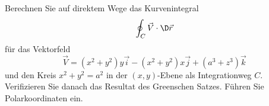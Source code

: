 \begin{atiTask}[
  title = Kurvenintegral mit Polarkoordinaten
]
Berechnen Sie auf direktem Wege das Kurvenintegral
\[
\oint_C \vec{V}\cdot \D \vec{r}
\]
für das Vektorfeld
\[
\vec{V}=(x^2+y^2)y\vec{i}-(x^2+y^2)x\vec{j}+(a^3+z^3)\vec{k}
\]
und den Kreis $x^2+y^2=a^2$ in der $(x,y)$-Ebene als Integrationweg $C$. Verifizieren Sie danach das Resultat des Greenschen Satzes. Führen Sie Polarkoordinaten ein.
\end{atiTask}